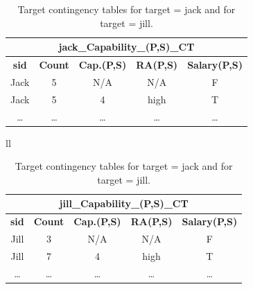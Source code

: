 \begin{table}[htbp] 
\centering
\caption{Target contingency tables for target = jack and for target = jill.}

  \begin{tabular}{|c|c|c|c|c|} 
    \multicolumn{5}{c}{\textbf{jack\_Capability\_(P,S)\_CT}} \\  \hline
    \textbf{sid}   & \textbf{Count} &\textbf{ Cap.(P,S)} & \textbf{RA(P,S)} & \textbf{Salary(P,S)} \\  \hline
    Jack  & 5     & N/A   & N/A   & F \\ \hline
    Jack  & 5     & 4     & high  & T \\ \hline
    \dots    &  \dots      &  \dots     & \dots      & \dots   \\ \hline
    \end{tabular}%

\bigskip

\begin{tabular}{ll}
  \begin{tabular}{|c|c|c|c|c|} 
    \multicolumn{5}{c}{\textbf{jill\_Capability\_(P,S)\_CT}} \\  \hline
    \textbf{sid}   & \textbf{Count} &\textbf{ Cap.(P,S)} & \textbf{RA(P,S)} & \textbf{Salary(P,S)} \\  \hline
    Jill  & 3     & N/A   & N/A   & F \\ \hline
    Jill  & 7     & 4     & high  & T \\ \hline
    \dots    &  \dots      &  \dots     & \dots      & \dots   \\ \hline
    \end{tabular}%
\end{tabular}

 \label{table:targetct}
\end{table}




